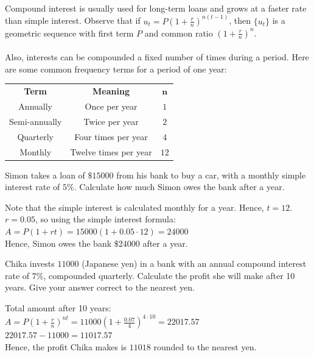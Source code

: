 \documentclass[12pt, a4paper, titlepage, twoside]{article}
\newcounter{excount}[subsection]
\begin{document}
	\paragraph{}
	Compound interest is usually used for long-term loans and grows at a faster rate than simple interest. Observe that if
	$u_t = P\left(1+\frac{r}{n}\right)^{n(t-1)}$, then $\{u_t\}$ is a geometric sequence with first term $P$ and common ratio 
	$\left(1+\frac{r}{n}\right)^n$.
	
	\paragraph{}
	Also, interests can be compounded a fixed number of times during a period. Here are some common frequency terms for a
	period of one year:
	
	\begin{longtable}{|c|c|c|}
		\hline
		\textbf{Term} & \textbf{Meaning} & $\mathbold{n}$\\
		\hhline{|=|=|=|}
		Annually & Once per year & $1$\\
		\hline
		Semi-annually & Twice per year & $2$\\
		\hline
		Quarterly & Four times per year & $4$\\
		\hline
		Monthly & Twelve times per year & $12$\\
		\hline
	\end{longtable}
	
	\begin{ex}
		Simon takes a loan of $\$\num{15000}$ from his bank to buy a car, with a monthly simple interest rate of $5\%$. Calculate 
		how much Simon owes the bank after a year.
		
		\hfill
		\tcbline
		\hfill
		
		Note that the simple interest is calculated monthly for a year. Hence, $t=12$. $r = 0.05$, so using the simple interest formula:\\
		
		$A = P(1+rt) = 15000(1+0.05 \cdot 12) = 24000$\\
		
		Hence, Simon owes the bank $\$\num{24000}$ after a year.
	\end{ex}
	
	\hfill
	
	\stepcounter{excount}
	\begin{ex}
		Chika invests \textyen $\num{11000}$ (Japanese yen) in a bank with an annual compound interest rate of $7\%$, 
		compounded quarterly. Calculate the profit she will make after 10 years. Give your answer correct to the nearest yen.
		
		\hfill
		\tcbline
		\hfill
		
		Total amount after 10 years: \\
		$A = P(1+\frac{r}{n})^{nt} = 11000(1+\frac{0.07}{4})^{4 \cdot 10} = 22017.57$\\
		
		$22017.57 - 11000 = 11017.57$\\

		Hence, the profit Chika makes is \textyen $\num{11018}$ rounded to the nearest yen.
	\end{ex}
	
\end{document}
